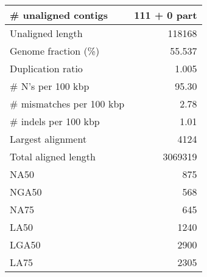 \documentclass[12pt,a4paper]{article}
\begin{document}
\begin{table}[ht]
\begin{center}
\begin{tabular}{|l*{1}{|r}|}
\# unaligned contigs & 111 + 0 part \\ \hline
Unaligned length & 118168 \\ \hline
Genome fraction (\%) & 55.537 \\ \hline
Duplication ratio & 1.005 \\ \hline
\# N's per 100 kbp & 95.30 \\ \hline
\# mismatches per 100 kbp & 2.78 \\ \hline
\# indels per 100 kbp & 1.01 \\ \hline
Largest alignment & 4124 \\ \hline
Total aligned length & 3069319 \\ \hline
NA50 & 875 \\ \hline
NGA50 & 568 \\ \hline
NA75 & 645 \\ \hline
LA50 & 1240 \\ \hline
LGA50 & 2900 \\ \hline
LA75 & 2305 \\ \hline
\end{tabular}
\end{center}
\end{table}
\end{document}

